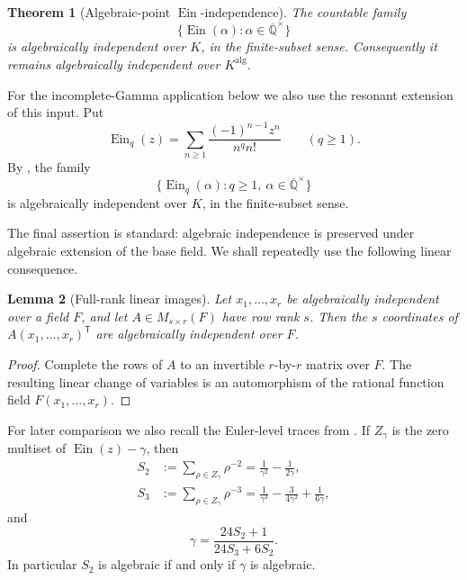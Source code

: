\documentclass[11pt]{article}
\theoremstyle{keio}
\newtheorem{theorem}{Theorem}[section]
\newtheorem{lemma}[theorem]{Lemma}
\theoremstyle{definition}
\theoremstyle{remark}
\newcommand{\Qbar}{\overline{\mathbb Q}}
\newcommand{\Ein}{\operatorname{Ein}}
\begin{document}
\begin{theorem}[Algebraic-point \(\Ein\)-independence]
\label{thm:input-independence}
The countable family
\[
 \{\Ein(\alpha):\alpha\in\Qbar^\times\}
\]
is algebraically independent over \(K\), in the finite-subset sense.
Consequently it remains algebraically independent over
\(K^{\mathrm{alg}}\).
\end{theorem}

For the incomplete-Gamma application below we also use the resonant
extension of this input.  Put
\[
 \Ein_q(z)=\sum_{n\ge1}\frac{(-1)^{n-1}z^n}{n^q n!}
 \qquad(q\ge1).
\]
By \cite[Thm.~1.4]{KEIO2026I}, the family
\begin{equation}\label{eq:resonant-input}
 \{\Ein_q(\alpha):q\ge1,\ \alpha\in\Qbar^\times\}
\end{equation}
is algebraically independent over \(K\), in the finite-subset sense.

The final assertion is standard: algebraic independence is preserved under
algebraic extension of the base field.  We shall repeatedly use the following
linear consequence.

\begin{lemma}[Full-rank linear images]
\label{lem:linear-images}
Let \(x_1,\ldots,x_r\) be algebraically independent over a field \(F\), and
let \(A\in M_{s\times r}(F)\) have row rank \(s\).  Then the \(s\) coordinates
of \(A(x_1,\ldots,x_r)^{\mathsf T}\) are algebraically independent over \(F\).
\end{lemma}

\begin{proof}
Complete the rows of \(A\) to an invertible \(r\)-by-\(r\) matrix over \(F\).
The resulting linear change of variables is an automorphism of the rational
function field \(F(x_1,\ldots,x_r)\).
\end{proof}

For later comparison we also recall the Euler-level traces from
\cite[Thm.~14.5]{KEIO2026I}.  If \(Z_\gamma\) is the zero multiset of
\(\Ein(z)-\gamma\), then
\begin{align}
 S_2&:=\sum_{\rho\in Z_\gamma}\rho^{-2}
 =\frac1{\gamma^2}-\frac1{2\gamma},\label{eq:S2}\\
 S_3&:=\sum_{\rho\in Z_\gamma}\rho^{-3}
 =\frac1{\gamma^3}-\frac3{4\gamma^2}+\frac1{6\gamma},\label{eq:S3}
\end{align}
and
\begin{equation}\label{eq:gamma-recovery}
 \gamma=\frac{24S_2+1}{24S_3+6S_2}.
\end{equation}
In particular \(S_2\) is algebraic if and only if \(\gamma\) is algebraic.
\end{document}
